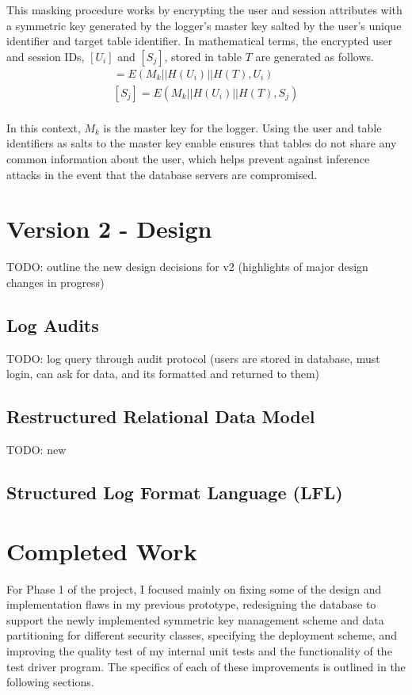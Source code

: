 \documentclass{sig-alternate}
\begin{document}
This masking procedure works by encrypting the user and session attributes with a symmetric key generated
by the logger's master key salted by the user's unique identifier and target table identifier. In mathematical
terms, the encrypted user and session IDs, $[U_i]$ and $[S_j]$, stored in table $T$ are generated as follows.
\begin{align*}
[U_i] = E(M_k || H(U_i) || H(T), U_i) \\
[S_j] = E(M_k || H(U_i) || H(T), S_j) \\
\end{align*}

In this context, $M_k$ is the master key for the logger. Using the user and table identifiers as salts to the master key 
enable ensures that tables do not share any common information about the user, which helps prevent against 
inference attacks in the event that the database servers are compromised.

\section{Version 2 - Design}
TODO: outline the new design decisions for v2 (highlights of major design changes in progress)

\subsection{Log Audits}
\label{sec:audit}
TODO: log query through audit protocol (users are stored in database, must login, can ask for data, and its formatted and returned to them)

\subsection{Restructured Relational Data Model}
TODO: new 

\subsection{Structured Log Format Language (LFL)}

\section{Completed Work}
For Phase 1 of the project, I focused mainly on fixing some of the design and implementation flaws in my previous 
prototype, redesigning the database to support the newly implemented symmetric key management scheme and data 
partitioning for different security classes, specifying the deployment scheme, and improving the quality test
of my internal unit tests and the functionality of the test driver program. The specifics of each of these improvements is
outlined in the following sections.
\end{document}
